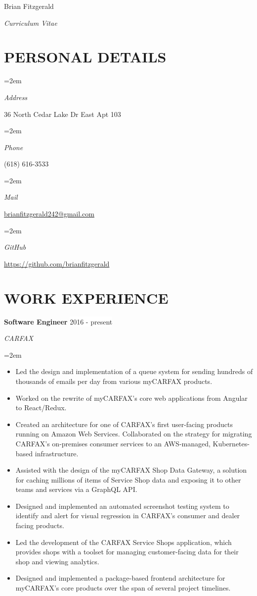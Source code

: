 \documentclass[paper=a4,fontsize=11pt]{scrartcl} %
\newlength{\spacebox}
\newcommand{\sepspace}{\vspace*{1em}}		%
\newcommand{\MyName}[1]{ %
			\Huge \usefont{OT1}{phv}{b}{n} \hfill #1
			\par \normalsize \normalfont}
\newcommand{\MySlogan}[1]{ %
			\large \usefont{OT1}{phv}{m}{n}\hfill \textit{#1}
			\par \normalsize \normalfont}
\newcommand{\NewPart}[1]{\section*{\uppercase{#1}}}
\newcommand{\PersonalEntry}[2]{
			\noindent\hangindent=2em\hangafter=0 %
			\parbox{\spacebox}{        %
			\textit{#1}}		       %
			\hspace{1.5em} #2 \par}    %
\newcommand{\EducationEntry}[4]{
			\noindent \textbf{#1} \hfill      %
			\colorbox{Black}{%
				\parbox{6em}{%
				\hfill\color{White}#2}} \par  %
			\noindent \textit{#3} \par        %
			\noindent\hangindent=2em\hangafter=0 \small #4 %
			\normalsize \par}
\newcommand{\WorkEntry}[4]{				  %
			\noindent \textbf{#1} \hfill      %
			\colorbox{White}{\color{Black}#2} \par  %
			\noindent \textit{#3} \par              %
			\noindent\hangindent=2em\hangafter=0 \small #4 %
			\normalsize \par}
\begin{document}
	
	\MyName{Brian Fitzgerald}
	\MySlogan{Curriculum Vitae}
	
	\sepspace
	
	\NewPart{Personal details}{}
	
	\PersonalEntry{Address}{36 North Cedar Lake Dr East Apt 103}
	\PersonalEntry{Phone}{(618) 616-3533}
	\PersonalEntry{Mail}{\url{brianfitzgerald242@gmail.com}}
	\PersonalEntry{GitHub}{\url{https://github.com/brianfitzgerald}}
	
	\NewPart{Work experience}{}
	
	\WorkEntry{Software Engineer}{2016 - present}{CARFAX}{
		\begin{itemize}
			\item Led the design and implementation of a queue system for sending hundreds of thousands of emails per day from various myCARFAX products.
			\item Worked on the rewrite of myCARFAX's core web applications from Angular to React/Redux.
			\item Created an architecture for one of CARFAX's first user-facing products running on Amazon Web Services. Collaborated on the strategy for migrating CARFAX's on-premises consumer services to an AWS-managed, Kubernetes-based infrastructure.
			\item Assisted with the design of the myCARFAX Shop Data Gateway, a solution for caching millions of items of Service Shop data and exposing it to other teams and services via a GraphQL API.
			\item Designed and implemented an automated screenshot testing system to identify and alert for visual regression in CARFAX's consumer and dealer facing products.
			\item Led the development of the CARFAX Service Shops application, which provides shops with a toolset for managing customer-facing data for their shop and viewing analytics.
			\item Designed and implemented a package-based frontend architecture for myCARFAX's core products over the span of several project timelines.
		\end{itemize}
	}
	\sepspace
	
\end{document}
